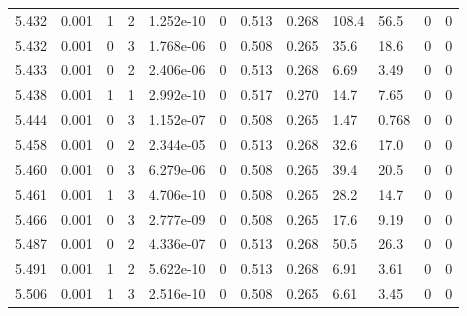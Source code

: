 \documentclass[preview]{standalone}
\begin{document}
{{{{{{{{{{{{{{\begin{tabular}{L{1.2cm}C{1.2cm} C{0.3cm}C{0.5cm} C{1.4cm}C{1.4cm} C{1.4cm}C{1.4cm} C{1.6cm}C{1.6cm} C{1.6cm}C{1.6cm}}
  5.432  &  0.001  & 1     &  2 &  1.252e-10  & 0  &  0.513&   0.268& 108.4 & 56.5   &  0 & 0  \\ 
  5.432  &  0.001  & 0     &  3 &  1.768e-06  & 0  &  0.508&   0.265& 35.6 & 18.6   &  0 & 0  \\ 
  5.433  &  0.001  & 0     &  2 &  2.406e-06  & 0  &  0.513&   0.268& 6.69 & 3.49   &  0 & 0  \\ 
  5.438  &  0.001  & 1     &  1 &  2.992e-10  & 0  &  0.517&   0.270& 14.7 & 7.65   &  0 & 0  \\ 
  5.444  &  0.001  & 0     &  3 &  1.152e-07  & 0  &  0.508&   0.265& 1.47 & 0.768   &  0 & 0  \\ 
  5.458  &  0.001  & 0     &  2 &  2.344e-05  & 0  &  0.513&   0.268& 32.6 & 17.0   &  0 & 0  \\ 
  5.460  &  0.001  & 0     &  3 &  6.279e-06  & 0  &  0.508&   0.265& 39.4 & 20.5   &  0 & 0  \\ 
  5.461  &  0.001  & 1     &  3 &  4.706e-10  & 0  &  0.508&   0.265& 28.2 & 14.7   &  0 & 0  \\ 
  5.466  &  0.001  & 0     &  3 &  2.777e-09  & 0  &  0.508&   0.265& 17.6 & 9.19   &  0 & 0  \\ 
  5.487  &  0.001  & 0     &  2 &  4.336e-07  & 0  &  0.513&   0.268& 50.5 & 26.3   &  0 & 0  \\ 
  5.491  &  0.001  & 1     &  2 &  5.622e-10  & 0  &  0.513&   0.268& 6.91 & 3.61   &  0 & 0  \\ 
  5.506  &  0.001  & 1     &  3 &  2.516e-10  & 0  &  0.508&   0.265& 6.61 & 3.45   &  0 & 0  \\ 
\hline 
\end{tabular} 

}}}}}}}}}}}}}}
\end{document}
